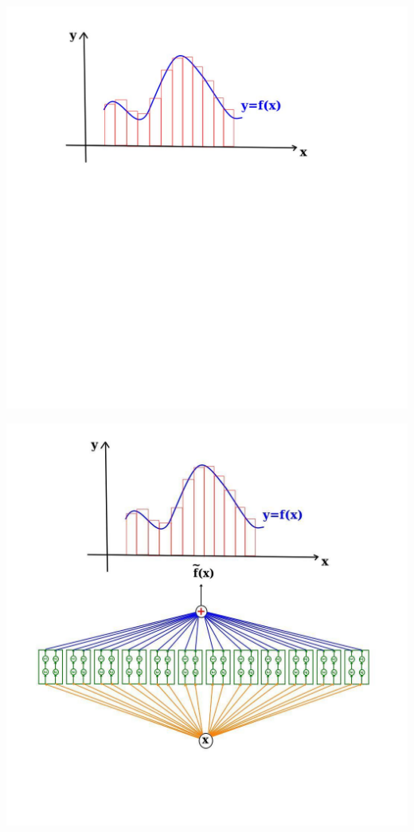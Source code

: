 \documentclass[12pt,aspectratio=169]{beamer}
\begin{document}
\begin{frame}
\begin{center}
\includegraphics[scale=0.35]{real2}
\end{center}
\end{frame}


\begin{frame}
\begin{center}
\includegraphics[scale=0.35]{real3}
\end{center}
\end{frame}
\end{document}
